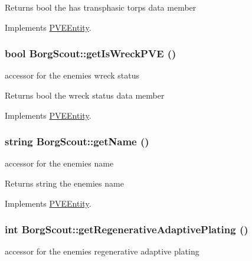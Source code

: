 \begin{DoxyReturn}{Returns}
bool the has transphasic torps data member 
\end{DoxyReturn}


Implements \hyperlink{classPVEEntity}{PVEEntity}.

\hypertarget{classBorgScout_ad904fc2d7473517dc3e9f9a896b1b870}{
\subsubsection[{getIsWreckPVE}]{\setlength{\rightskip}{0pt plus 5cm}bool BorgScout::getIsWreckPVE ()}}
\label{d5/d8c/classBorgScout_ad904fc2d7473517dc3e9f9a896b1b870}
accessor for the enemies wreck status

\begin{DoxyReturn}{Returns}
bool the wreck status data member 
\end{DoxyReturn}


Implements \hyperlink{classPVEEntity}{PVEEntity}.

\hypertarget{classBorgScout_a59bfebc7126c503bb8f83a5572149e23}{
\subsubsection[{getName}]{\setlength{\rightskip}{0pt plus 5cm}string BorgScout::getName ()}}
\label{d5/d8c/classBorgScout_a59bfebc7126c503bb8f83a5572149e23}
accessor for the enemies name

\begin{DoxyReturn}{Returns}
string the enemies name 
\end{DoxyReturn}


Implements \hyperlink{classPVEEntity}{PVEEntity}.

\hypertarget{classBorgScout_af4ab31bd4edc30c887b4a36f9a0f5a62}{
\subsubsection[{getRegenerativeAdaptivePlating}]{\setlength{\rightskip}{0pt plus 5cm}int BorgScout::getRegenerativeAdaptivePlating ()}}
\label{d5/d8c/classBorgScout_af4ab31bd4edc30c887b4a36f9a0f5a62}
accessor for the enemies regenerative adaptive plating

